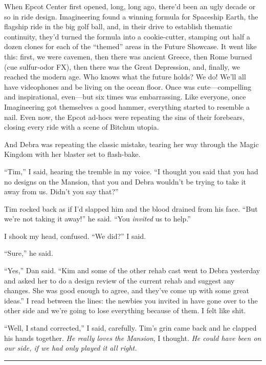 When Epcot Center first opened, long, long ago, there'd been an
ugly decade or so in ride design. Imagineering found a winning
formula for Spaceship Earth, the flagship ride in the big golf
ball, and, in their drive to establish thematic continuity, they'd
turned the formula into a cookie-cutter, stamping out half a dozen
clones for each of the “themed” areas in the Future Showcase. It
went like this: first, we were cavemen, then there was ancient
Greece, then Rome burned (cue sulfur-odor FX), then there was the
Great Depression, and, finally, we reached the modern age. Who
knows what the future holds? We do! We'll all have videophones and
be living on the ocean floor. Once was cute—compelling and
inspirational, even—but six times was embarrassing. Like everyone,
once Imagineering got themselves a good hammer, everything started
to resemble a nail. Even now, the Epcot ad-hocs were repeating the
sins of their forebears, closing every ride with a scene of Bitchun
utopia.

And Debra was repeating the classic mistake, tearing her way
through the Magic Kingdom with her blaster set to flash-bake.

“Tim,” I said, hearing the tremble in my voice. “I thought you said
that you had no designs on the Mansion, that you and Debra wouldn't
be trying to take it away from us. Didn't you say that?”

Tim rocked back as if I'd slapped him and the blood drained from
his face. “But we're not taking it away!” he said. “You
\emph{invited} us to help.”

I shook my head, confused. “We did?” I said.

“Sure,” he said.

“Yes,” Dan said. “Kim and some of the other rehab cast went to
Debra yesterday and asked her to do a design review of the current
rehab and suggest any changes. She was good enough to agree, and
they've come up with some great ideas.” I read between the lines:
the newbies you invited in have gone over to the other side and
we're going to lose everything because of them. I felt like shit.

“Well, I stand corrected,” I said, carefully. Tim's grin came back
and he clapped his hands together.
\emph{He really loves the Mansion}, I thought.
\emph{He could have been on our side, if we had only played it all right.}

\begin{center}\rule{3in}{0.4pt}\end{center}

